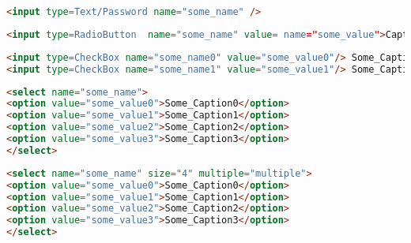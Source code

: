 \begin{Code}
\begin{lstlisting}[language=HTML,label=code:HTMLTxt,caption=HTML tag for Text/Password]
<input type=Text/Password name="some_name" />
\end{lstlisting}
\end{Code}

\begin{Code}
\begin{lstlisting}[language=HTML,label=code:HTMLradi,caption=HTML tag for RadioButton]
<input type=RadioButton  name="some_name" value= name="some_value">Caption
\end{lstlisting}
\end{Code}

\begin{Code}
\begin{lstlisting}[language=HTML,label=code:HTMLcheck,caption=HTML tag for RadioButton]
<input type=CheckBox name="some_name0" value="some_value0"/> Some_Caption0
<input type=CheckBox name="some_name1" value="some_value1"/> Some_Caption1
\end{lstlisting}
\end{Code}

\begin{Code}
\begin{lstlisting}[language=HTML,label=code:HTMLdrop,caption=HTML tag for DropDown]
<select name="some_name">
<option value="some_value0">Some_Caption0</option>
<option value="some_value1">Some_Caption1</option>
<option value="some_value2">Some_Caption2</option>
<option value="some_value3">Some_Caption3</option>
</select>
\end{lstlisting}
\end{Code}

\begin{Code}
\begin{lstlisting}[language=HTML,label=code:HTMLmulSel,caption=HTML tag for MultipleSelect]
<select name="some_name" size="4" multiple="multiple">
<option value="some_value0">Some_Caption0</option>
<option value="some_value1">Some_Caption1</option>
<option value="some_value2">Some_Caption2</option>
<option value="some_value3">Some_Caption3</option>
</select>
\end{lstlisting}
\end{Code}